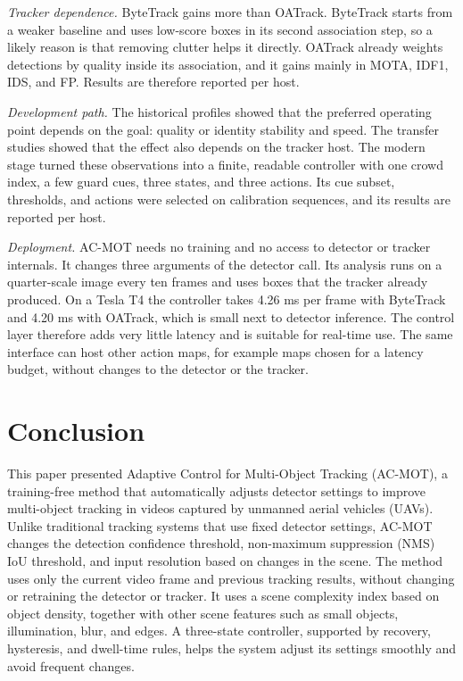 \documentclass[pdflatex,sn-mathphys-num,iicol]{sn-jnl}
\begin{document}
\emph{Tracker dependence.} ByteTrack gains more than OATrack. ByteTrack starts
from a weaker baseline and uses low-score boxes in its second association
step, so a likely reason is that removing clutter helps it directly. OATrack
already weights detections by quality inside its association, and it gains
mainly in MOTA, IDF1, IDS, and FP. Results are therefore reported per host.

\emph{Development path.} The historical profiles showed that the preferred
operating point depends on the goal: quality or identity stability and speed.
The transfer studies showed that the effect also depends on the tracker host.
The modern stage turned these observations into a finite, readable controller
with one crowd index, a few guard cues, three states, and three actions. Its
cue subset, thresholds, and actions were selected on calibration sequences,
and its results are reported per host.

\emph{Deployment.} AC-MOT needs no training and no access to detector or
tracker internals. It changes three arguments of the detector call. Its
analysis runs on a quarter-scale image every ten frames and uses boxes that
the tracker already produced. On a Tesla T4 the controller takes 4.26 ms per
frame with ByteTrack and 4.20 ms with OATrack, which is small next to detector
inference. The control layer therefore adds very little latency and is
suitable for real-time use. The same interface can host other action maps, for
example maps chosen for a latency budget, without changes to the detector or
the tracker.
\section{Conclusion}\label{sec:conclusion}

This paper presented Adaptive Control for Multi-Object Tracking (AC-MOT), a
training-free method that automatically adjusts detector settings to improve
multi-object tracking in videos captured by unmanned aerial vehicles (UAVs).
Unlike traditional tracking systems that use fixed detector settings, AC-MOT
changes the detection confidence threshold, non-maximum suppression (NMS) IoU
threshold, and input resolution based on changes in the scene. The method uses
only the current video frame and previous tracking results, without changing
or retraining the detector or tracker. It uses a scene complexity index based
on object density, together with other scene features such as small objects,
illumination, blur, and edges. A three-state controller, supported by
recovery, hysteresis, and dwell-time rules, helps the system adjust its
settings smoothly and avoid frequent changes.
\end{document}
